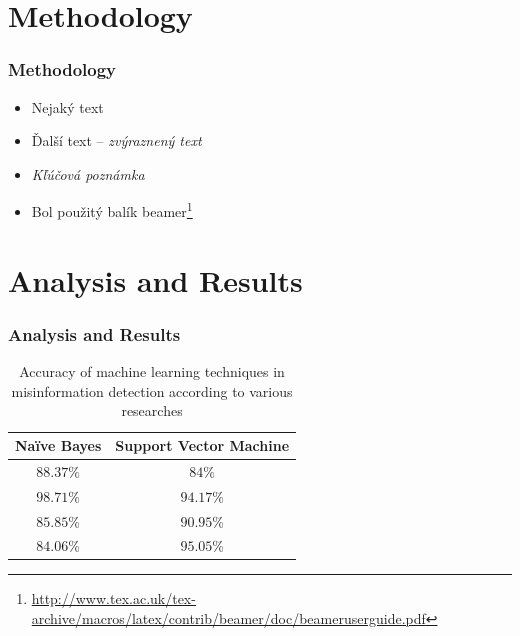 \documentclass{beamer}
\newcommand{\footcite}[1]{\footnote{\tiny #1}}
\newcommand{\emp}[1]{\textit{\alert{#1}}}
\begin{document}
\section{Methodology}

\begin{frame}[fragile=singleslide]\frametitle{Methodology}
\begin{itemize}
\item Nejaký text
\item Ďalší text -- \emph{zvýraznený text}
\item \emp{Kľúčová poznámka} %

\item Bol použitý balík beamer\footcite{\url{http://www.tex.ac.uk/tex-archive/macros/latex/contrib/beamer/doc/beameruserguide.pdf}}
\end{itemize}
\end{frame}

\section{Analysis and Results}

\begin{frame}[fragile=singleslide]\frametitle{Analysis and Results}
\begin{table}[H]
\centering
\begin{tabular}{||c c||} 
 \hline
Naïve Bayes & Support Vector Machine\\ [0.5ex] 
 \hline\hline
 $88.37\%$ & $84\%$  \\
 \hline
 $98.71\%$ & $94.17\%$  \\
 \hline
 $85.85\%$ & $90.95\%$  \\
 \hline
 $84.06\%$ & $95.05\%$  \\ [1ex]
 \hline
\end{tabular}
\caption{\centering Accuracy of machine learning techniques in misinformation detection according to various researches}
\label{table:results}
\end{table}
\end{frame}
\end{document}
